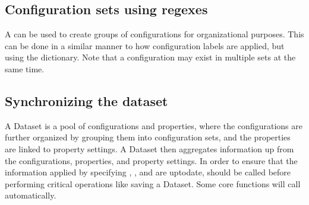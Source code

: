 \documentclass[letterpaper,10pt,english]{sphinxmanual}
\begin{document}
\begin{sphinxVerbatim}[commandchars=\\\{\}]
  
     
     
\end{sphinxVerbatim}


\subsection{Configuration sets using regexes}
\label{\detokenize{basic_example:configuration-sets-using-regexes}}
\sphinxAtStartPar
A {\hyperref[\detokenize{configuration_set:colabfit.tools.configuration_sets.ConfigurationSet}]{}} can be used to
create groups of configurations for organizational purposes. This can be done in
a similar manner to how configuration labels are applied, but using the
 dictionary. Note that a configuration may
exist in multiple sets at the same time.

\begin{sphinxVerbatim}[commandchars=\\\{\}]
  
       
     
\end{sphinxVerbatim}


\subsection{Synchronizing the dataset}
\label{\detokenize{basic_example:synchronizing-the-dataset}}
\sphinxAtStartPar
A Dataset is a pool of configurations and properties, where the configurations
are further organized by grouping them into configuration sets, and the
properties are linked to property settings. A Dataset then aggregates
information up from the configurations, properties, and property settings. In
order to ensure that the information applied by specifying
, , and
 are up\sphinxhyphen{}to\sphinxhyphen{}date, 
should be called before performing critical operations like saving a Dataset.
Some core functions will call  automatically.
\end{document}
